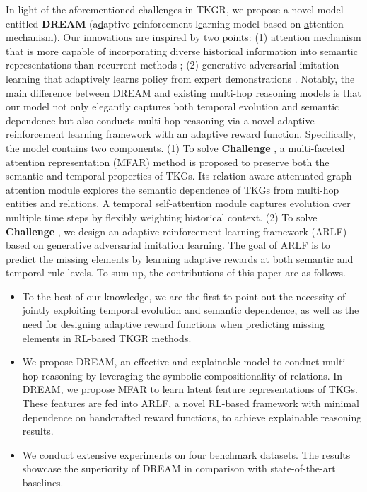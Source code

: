 \documentclass[sigconf,natbib=true]{acmart}
\begin{document}
In light of the aforementioned challenges in TKGR, we propose a novel model entitled \textbf{DREAM} (a\underline{d}aptive \underline{r}einforcement l\underline{e}arning model based on \underline{a}ttention \underline{m}echanism). Our innovations are  inspired by two points: (1) attention mechanism that is more capable of incorporating diverse historical information into semantic representations than recurrent methods \cite{attention}; (2) generative  adversarial imitation learning that adaptively learns policy from expert demonstrations \cite{GAIL}. Notably, the main difference between DREAM and existing multi-hop reasoning models is that our model not only elegantly captures both temporal evolution and semantic dependence but also conducts multi-hop reasoning via  a novel adaptive reinforcement learning framework with an adaptive reward function. Specifically, the model contains two components. (1) To solve \textbf{Challenge \uppercase\expandafter{}}, a multi-faceted attention representation (MFAR) method is proposed to preserve both the semantic and temporal properties of TKGs. Its relation-aware attenuated graph attention module explores the semantic dependence of TKGs from multi-hop entities and relations. A temporal self-attention module captures evolution over multiple time steps by flexibly weighting historical context.  (2) To solve \textbf{Challenge \uppercase\expandafter{}}, we design an adaptive reinforcement learning  framework (ARLF) based on generative adversarial imitation learning. The goal of ARLF is to predict the missing elements by learning adaptive rewards at both semantic and temporal rule levels. To sum up, the contributions of this paper are as follows. 


\begin{itemize}
    \item To the best of our knowledge, we are the first to point out the necessity of jointly exploiting temporal evolution and semantic dependence, as well as the need for designing adaptive reward functions when predicting missing elements in RL-based TKGR methods.

   \item We propose DREAM, an effective and  explainable model to conduct multi-hop reasoning by leveraging the symbolic compositionality of relations. In DREAM, we propose MFAR to learn latent feature representations of TKGs. These features are fed into ARLF, a novel RL-based framework with minimal dependence on handcrafted reward functions, to achieve
  explainable reasoning results.

   \item We conduct extensive experiments on four benchmark datasets. The results showcase the superiority of DREAM in comparison with state-of-the-art baselines.
\end{itemize}
\end{document}

